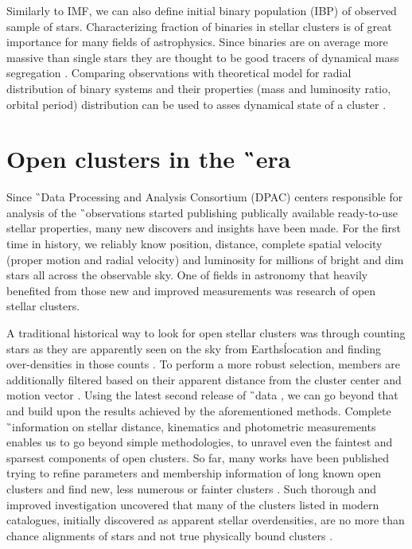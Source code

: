 Similarly to IMF, we can also define initial binary population (IBP) of observed sample of stars. Characterizing fraction of binaries in stellar clusters is of great importance for many fields of astrophysics. Since binaries are on average more massive than single stars they are thought to be good tracers of dynamical mass segregation \cite{2015arXiv151000099D}. Comparing observations with theoretical model for radial distribution of binary systems and their properties (mass and luminosity ratio, orbital period) distribution can be used to asses dynamical state of a cluster \cite{1999NewA....4..495K}.

\section{Open clusters in the \G\ era}
\label{sec:open_clust_gaia}
Since \G\ Data Processing and Analysis Consortium (DPAC) centers responsible for analysis of the \G\ observations started publishing publically available ready-to-use stellar properties, many new discovers and insights have been made. For the first time in history, we reliably know position, distance, complete spatial velocity (proper motion and radial velocity) and luminosity for millions of bright and dim stars all across the observable sky. One of fields in astronomy that heavily benefited from those new and improved measurements was research of open stellar clusters.

A traditional historical way to look for open stellar clusters was through counting stars as they are apparently seen on the sky from Earths\' location and finding over-densities in those counts \citep{1988AJ.....95..108L, 2014A&A...568A..51S}. To perform a more robust selection, members are additionally filtered based on their apparent distance from the cluster center and motion vector \citep{2017A&A...601A..19G}. Using the latest second release of \G\ data \citep[DR2,][]{2018arXiv180409365G}, we can go beyond that and build upon the results achieved by the aforementioned methods. Complete \G\ information on stellar distance, kinematics and photometric measurements enables us to go beyond simple methodologies, to unravel even the faintest and sparsest components of open clusters. So far, many works have been published trying to refine parameters and membership information of long known open clusters \citep{2017A&A...601A..19G, 2018A&A...618A..93C, 2019A&A...627A..35C} and find new, less numerous or fainter clusters \citep{2019arXiv190904612B, 2019ApJS..245...32L, 2019JKAS...52..145S, 2019A&A...624A.126C, 2020arXiv200107122C}. Such thorough and improved investigation uncovered that many of the clusters listed in modern catalogues, initially discovered as apparent stellar overdensities, are no more than chance alignments of stars and not true physically bound clusters \citep{1998A&A...340..402B, 2000A&A...357..145C, 2016AJ....152....7H, 2018MNRAS.480.5242K, 2020A&A...633A..99C}.


